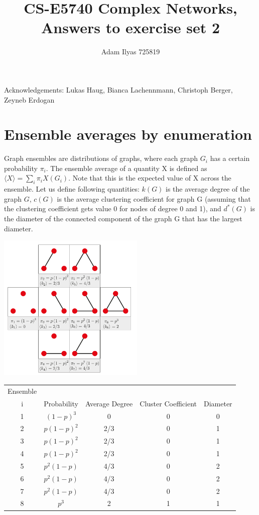 \documentclass[a4paper,12pt]{article}
\author{Adam Ilyas 725819}
\title{
CS-E5740 Complex Networks, \\
Answers to exercise set 2
}
\begin{document}
\vspace{8pt}

\maketitle

Acknowledgements: Lukas Haug, Bianca Lachennmann, Christoph Berger, Zeyneb Erdogan
\section{Ensemble averages by enumeration}

Graph ensembles are distributions of graphs, where each graph
$G_i$ has a certain probability $\pi_i$.
The ensemble average of a quantity X is defined as $\langle X \rangle = \sum_i\pi_iX(G_i)$.
Note that this is the expected value of X across the ensemble.
Let us define following quantities: $k(G)$ is the average
degree of the graph $G$, $c(G)$ is the average clustering coefficient for graph G (assuming that the
clustering coefficient gets value 0 for nodes of degree 0 and 1), and $d^*(G)$ is the diameter of the
connected component of the graph G that has the largest diameter.



\begin{minipage}{\linewidth}
\centering
\includegraphics[width=7cm]{assets/ensemble.png}
\end{minipage}

\begin{minipage}{\linewidth}
  \centering
  \begin{tabular}{c|c|c|c|c}
    Ensemble\\i & Probability  & Average Degree & Cluster Coefficient & Diameter\\
    \hline
    1 & $(1-p)^3$ & 0 & 0 & 0\\
    2 & $p(1-p)^2$ & 2/3 & 0 & 1\\
    3 & $p(1-p)^2$ & 2/3 & 0 & 1 \\
    4 & $p(1-p)^2$ & 2/3 & 0 & 1 \\
    5 & $p^2(1-p)$ & 4/3 & 0 & 2 \\
    6 & $p^2(1-p)$ & 4/3 & 0 & 2 \\
    7 & $p^2(1-p)$ & 4/3 & 0 & 2 \\
    8 & $p^3$ & 2 & 1 & 1
\end{tabular}     
\end{minipage}
\end{document}
